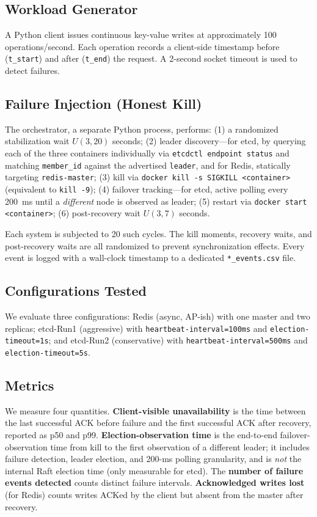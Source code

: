 \documentclass[conference]{IEEEtran}
\begin{document}
\subsection{Workload Generator}
A Python client issues continuous key-value writes at approximately 100 operations/second. Each operation records a client-side timestamp before (\texttt{t\_start}) and after (\texttt{t\_end}) the request. A 2-second socket timeout is used to detect failures.

\subsection{Failure Injection (Honest Kill)}
The orchestrator, a separate Python process, performs: (1) a randomized stabilization wait $U(3, 20)$ seconds; (2) leader discovery---for etcd, by querying each of the three containers individually via \texttt{etcdctl endpoint status} and matching \texttt{member\_id} against the advertised \texttt{leader}, and for Redis, statically targeting \texttt{redis-master}; (3) kill via \texttt{docker kill -s SIGKILL <container>} (equivalent to \texttt{kill -9}); (4) failover tracking---for etcd, active polling every 200~ms until a \textit{different} node is observed as leader; (5) restart via \texttt{docker start <container>}; (6) post-recovery wait $U(3, 7)$ seconds.

Each system is subjected to 20 such cycles. The kill moments, recovery waits, and post-recovery waits are all randomized to prevent synchronization effects. Every event is logged with a wall-clock timestamp to a dedicated \texttt{*\_events.csv} file.

\subsection{Configurations Tested}
We evaluate three configurations: Redis (async, AP-ish) with one master and two replicas; etcd-Run1 (aggressive) with \texttt{heartbeat-interval=100ms} and \texttt{election-timeout=1s}; and etcd-Run2 (conservative) with \texttt{heartbeat-interval=500ms} and \texttt{election-timeout=5s}.

\subsection{Metrics}
We measure four quantities. \textbf{Client-visible unavailability} is the time between the last successful ACK before failure and the first successful ACK after recovery, reported as p50 and p99. \textbf{Election-observation time} is the end-to-end failover-observation time from kill to the first observation of a different leader; it includes failure detection, leader election, and 200-ms polling granularity, and is \textit{not} the internal Raft election time (only measurable for etcd). The \textbf{number of failure events detected} counts distinct failure intervals. \textbf{Acknowledged writes lost} (for Redis) counts writes ACKed by the client but absent from the master after recovery.
\end{document}
